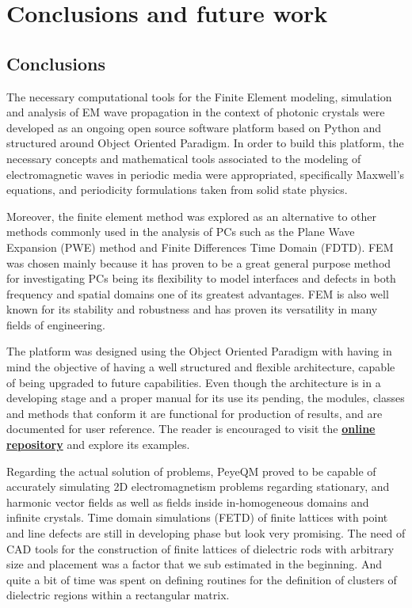 \chapter{Conclusions and future work}

\section{Conclusions}

The necessary computational tools for the Finite Element modeling, simulation and analysis of EM wave propagation in the context of photonic crystals were developed as an ongoing open source software platform based on Python and structured around Object Oriented Paradigm. 
In order to build this platform, the necessary concepts and mathematical tools associated to the modeling of electromagnetic waves in periodic media were appropriated, specifically Maxwell's equations, and periodicity formulations taken from solid state physics. 

Moreover, the finite element method was explored as an alternative to other methods commonly used in the analysis of PCs such as the Plane Wave Expansion (PWE) \cite{StevenJohnson2001} method and Finite Differences Time Domain (FDTD)\cite{Oskooi2009}. FEM was chosen mainly because it has proven to be a great general purpose method for investigating PCs \cite{Andonegui2013} being its flexibility to model interfaces and defects in both frequency and spatial domains one of its greatest advantages. FEM is also well known for its stability and robustness and has proven its versatility in many fields of engineering.

The platform was designed using the Object Oriented Paradigm with having in mind the objective of having a well structured and flexible architecture, capable of being upgraded to future capabilities. Even though the architecture is in a developing stage and a proper manual for its use its pending, the modules, classes and methods that conform it are functional for production of results, and are documented for user reference. The reader is encouraged to visit the \href{https://github.com/bebopsan/peyeQM/tree/Depuration}{\textbf{online repository}}  and explore its examples.

Regarding the actual solution of problems, PeyeQM proved to be capable of accurately simulating  2D electromagnetism problems regarding stationary, and harmonic vector fields as well as fields inside in-homogeneous domains and infinite crystals. Time domain simulations (FETD) of finite lattices with point and line defects are still in developing phase but look very promising. The need of CAD tools for the construction of finite lattices of dielectric rods with arbitrary size and placement was a factor that we sub estimated in the beginning. And quite a bit of time was spent on defining routines for the definition of clusters of  dielectric regions within a rectangular matrix.      

